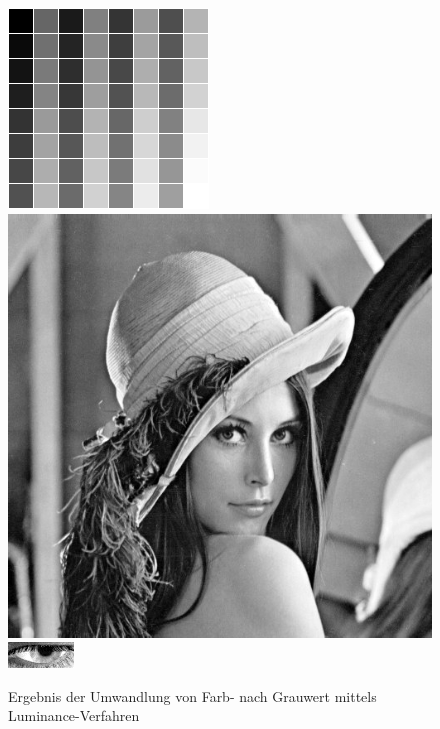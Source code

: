 \begin{figure}
	\centering
	\includegraphics[width=0.21\linewidth]{img/Farbkarte0}
	\includegraphics[width=0.21\linewidth]{img/Lena0}
	\includegraphics[width=0.21\linewidth]{img/Auge_0Gray}
	\caption{Ergebnis der Umwandlung von Farb- nach Grauwert mittels Luminance-Verfahren}
	\label{img_Luminance}
\end{figure}
